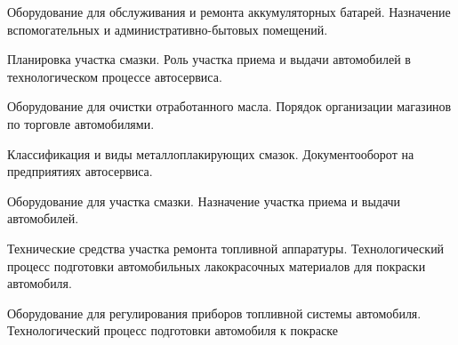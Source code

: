 \documentclass[
	14pt,
	a4paper,
	]
	{scrartcl}
\begin{document}
\vfill

\newpage


\shapk
{}
\setcounter{zad}{0}

\vfill
\z Оборудование для обслуживания и ремонта аккумуляторных батарей.
 \vfill
\z Назначение вспомогательных и административно-бытовых помещений.
 \vfill

\vfill

\newpage


\shapk
{}
\setcounter{zad}{0}

\vfill
\z Планировка участка смазки.
 \vfill
\z Роль участка приема и выдачи автомобилей в технологическом процессе автосервиса.
 \vfill

\vfill

\newpage


\shapk
{}
\setcounter{zad}{0}

\vfill
\z Оборудование для очистки отработанного масла.
 \vfill
\z Порядок организации магазинов по торговле автомобилями.
 \vfill

\vfill

\newpage


\shapk
{}
\setcounter{zad}{0}

\vfill
\z Классификация и виды металлоплакирующих смазок.
 \vfill
\z Документооборот на предприятиях автосервиса.
 \vfill

\vfill

\newpage


\shapk
{}
\setcounter{zad}{0}

\vfill
\z Оборудование для участка смазки.
 \vfill
\z Назначение участка приема и выдачи автомобилей.
 \vfill

\vfill

\newpage


\shapk
{}
\setcounter{zad}{0}

\vfill
\z Технические средства участка ремонта топливной аппаратуры.
 \vfill
\z Технологический процесс подготовки автомобильных лакокрасочных материалов для покраски автомобиля.
 \vfill

\vfill

\newpage


\shapk
{}
\setcounter{zad}{0}

\vfill
\z Оборудование для регулирования приборов топливной системы автомобиля.
 \vfill
\z Технологический процесс подготовки автомобиля к покраске
 \vfill
\end{document}
